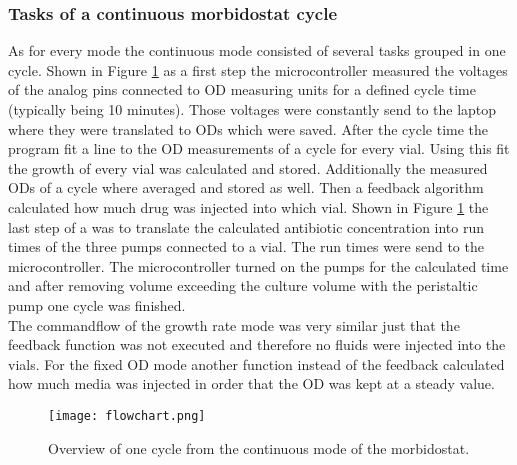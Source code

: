 \subsubsection{Tasks of a continuous morbidostat cycle}
As for every mode the continuous mode consisted of several tasks grouped in one cycle. Shown in Figure \ref{figure:flowchart} as a first step the microcontroller measured the voltages of the analog pins connected to OD measuring units for a defined cycle time (typically being 10 minutes). Those voltages were constantly send to the laptop where they were translated to ODs which were saved. After the cycle time the program fit a line to the OD measurements of a cycle for every vial. Using this fit the growth of every vial was calculated and stored. Additionally the measured ODs of a cycle where averaged and stored as well. Then a feedback algorithm calculated how much drug was injected into which vial. Shown in Figure \ref{figure:flowchart} the last step of a was to translate the calculated antibiotic concentration into run times of the three pumps connected to a vial. The run times were send to the microcontroller. The microcontroller turned on the pumps for the calculated time and after removing volume exceeding the culture volume with the peristaltic pump one cycle was finished. \\
The commandflow of the growth rate mode was very similar just that the feedback function was not executed and therefore no fluids were injected into the vials. For the fixed OD mode another function instead of the feedback  calculated how much media was injected in order that the OD was kept at a steady value. 

\begin{figure}
	\texttt{[image: flowchart.png]}
	\caption{Overview of one cycle from the continuous mode of the morbidostat.}
	\label{figure:flowchart}	
\end{figure}

